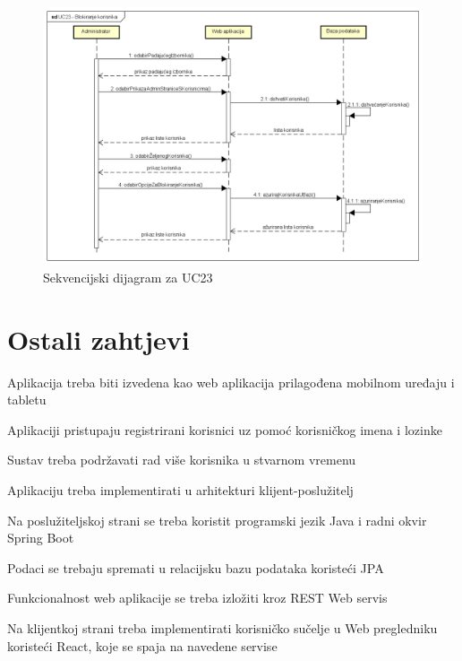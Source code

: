				\begin{figure}[htb]
					\centering
					\includegraphics[width=14cm]{slike/Sekvencijski_dijagram_-_UC23}
					\caption{Sekvencijski dijagram za UC23}
					\label{fig:Sekvencijski-UC23}
				\end{figure}
				\eject	
	
		\section{Ostali zahtjevi}
		
			\begin{packed_item}
				
				\item Aplikacija treba biti izvedena kao web aplikacija prilagođena mobilnom uređaju i tabletu
				\item Aplikaciji pristupaju registrirani korisnici uz pomoć korisničkog imena i lozinke
				\item Sustav treba podržavati rad više korisnika u stvarnom vremenu
				\item Aplikaciju treba implementirati u arhitekturi klijent-poslužitelj
				\item Na poslužiteljskoj strani se treba koristit programski jezik Java i radni okvir Spring Boot
				\item Podaci se trebaju spremati u relacijsku bazu podataka koristeći JPA
				\item Funkcionalnost web aplikacije se treba izložiti kroz REST Web servis
				\item Na klijentkoj strani treba implementirati korisničko sučelje u Web pregledniku koristeći React, koje se spaja na navedene servise
			\end{packed_item}
			 
			 
			 
	